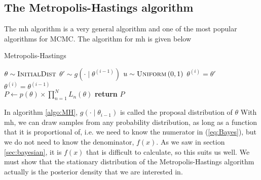\documentclass{article}
\theoremstyle{definition}
\begin{document}
\subsection{The Metropolis-Hastings algorithm}
The \gls{mh} algorithm is a very general algorithm and one of the most popular algorithms for MCMC. The algorithm for \gls{mh} is given below
\begin{algorithm}[H]\label{algo:MH}
    \caption{Metropolis-Hastings}
    \label{algo:MH}
    \begin{algorithmic}[1] %
        \State $\theta \sim \textsc{InitialDist}$ 
        \State$\theta' \sim g\left(\cdot \mid \theta^{\left(i-1\right)}\right)$
        \State $u\sim \textsc{Uniform}\left(0,1\right)$
        \State $\theta^{\left(i\right)} = \theta'$
        \Else 
        \State $\theta^{\left(i\right)} = \theta^{\left(i-1\right)}$
         \EndIf
         \EndFor
         \\
            \State $P \gets p\left(\theta\right)\times \prod_{n=1}^N L_n\left(\theta\right)$
           \State \textbf{return} $P$
        \EndFunction
    \end{algorithmic}
\end{algorithm}
In algorithm \ref{algo:MH}, $g\left(\cdot \mid \theta_{i-1}\right)$ is called the proposal distribution of $\theta$
With \gls{mh}, we can draw samples from any probability distribution, as long as a function that it is proportional of, i.e. we need to know the numerator in (\ref{eq:Bayes}), but we do not need to know the denominator, $f\left(x\right)$.
As we saw in section \ref{sec:bayesian}, it is $f\left(x\right)$ that is difficult to calculate, so this suits us well. 
We must show that the stationary distribution of the Metropolis-Hastings algorithm actually is the posterior density that we are interested in.
\end{document}
